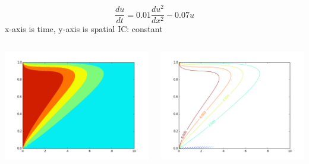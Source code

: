 \documentclass{beamer}
\begin{document}
\begin{frame}
    $$
    \frac{du}{dt} = 0.01\frac{du^{2}}{dx^{2}} - 0.07u
    $$
    \newline
    x-axis is time, y-axis is spatial
    \newline
    IC: constant
    \newline
    
  \begin{columns}[T]
    \begin{column}{.5\textwidth}
    
    \includegraphics[scale=0.25]{hm3.pdf}
    
    \end{column}
    
    \begin{column}{.5\textwidth}
   
    \includegraphics[scale=0.25]{cm3.pdf}
  
    \end{column}
  \end{columns}
\end{frame}
\end{document}
